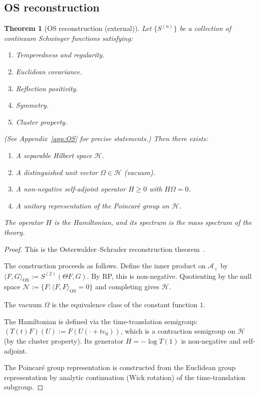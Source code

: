 \documentclass[12pt]{article}
\theoremstyle{plain}
\newtheorem{theorem}{Theorem}[section]
\theoremstyle{definition}
\numberwithin{equation}{section}
\begin{document}
\subsection{OS reconstruction}

\begin{theorem}[OS reconstruction (external)]\label{thm:OS}
Let $\{S^{(n)}\}$ be a collection of continuum Schwinger functions satisfying:
\begin{enumerate}[label=(OS\arabic*)]
\item Temperedness and regularity.
\item Euclidean covariance.
\item Reflection positivity.
\item Symmetry.
\item Cluster property.
\end{enumerate}
(See Appendix~\ref{app:OS} for precise statements.)
Then there exists:
\begin{enumerate}[label=(\roman*)]
\item A separable Hilbert space $\mathcal{H}$.
\item A distinguished unit vector $\Omega\in\mathcal{H}$ (vacuum).
\item A non-negative self-adjoint operator $H\geq 0$ with $H\Omega=0$.
\item A unitary representation of the Poincar\'e group on $\mathcal{H}$.
\end{enumerate}
The operator $H$ is the Hamiltonian, and its spectrum is the mass spectrum of the theory.
\end{theorem}

\begin{proof}
This is the Osterwalder--Schrader reconstruction theorem~\cite{OsterwalderSchrader}.

The construction proceeds as follows.  Define the inner product on $\mathcal{A}_+$ by $\langle F,G\rangle_{\mathrm{OS}}:=S^{(2)}(\Theta F,G)$.  By RP, this is non-negative.  Quotienting by the null space $\mathcal{N}:=\{F:\langle F,F\rangle_{\mathrm{OS}}=0\}$ and completing gives $\mathcal{H}$.

The vacuum $\Omega$ is the equivalence class of the constant function $1$.

The Hamiltonian is defined via the time-translation semigroup: $(T(t)F)(U):=F(U(\cdot+te_0))$, which is a contraction semigroup on $\mathcal{H}$ (by the cluster property).  Its generator $H=-\log T(1)$ is non-negative and self-adjoint.

The Poincar\'e group representation is constructed from the Euclidean group representation by analytic continuation (Wick rotation) of the time-translation subgroup.
\end{proof}
\end{document}

